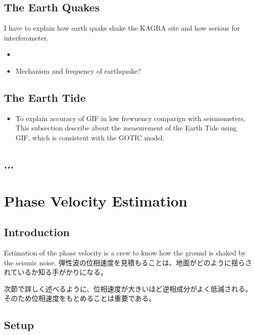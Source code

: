 \documentclass[a4paper,12pt]{book}
\begin{document}
\subsection{The Earth Quakes}
I have to explain how earth quake shake the KAGRA site and how serious for interferometer.
\begin{itemize}
\item 
\item Mechanism and frequency of earthquake?
\end{itemize}

\subsection{The Earth Tide}

\begin{itemize}
  \item To explain accuracy of GIF in low frewuency comparign with seismometers, This subsection describe about the measurement of the Earth Tide using GIF, which is consistent with the GOTIC model.
\end{itemize}

\subsection{...}




\section{Phase Velocity Estimation}
\subsection{Introduction}
Estimation of the phase velocity is a crew to know how the ground is shaked by the seismic noise. 
弾性波の位相速度を見積もることは、地面がどのように揺らされているか知る手がかりになる。




次節で詳しく述べるように、位相速度が大きいほど逆相成分がよく低減される。そのため位相速度をもとめることは重要である。

\subsection{Setup}
\end{document}
